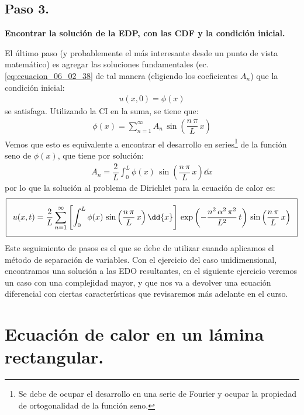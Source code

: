 \subsection{Paso 3.}

\textbf{Encontrar la solución de la EDP, con las CDF y la condición inicial.}

El último paso (y probablemente el más interesante desde un punto de vista matemático) es agregar las soluciones fundamentales (ec. \ref{eq:ecuacion_06_02_38} de tal manera (eligiendo los coeficientes $A_{n}$) que la condición inicial:
\begin{align*}
u(x, 0) = \phi (x)
\end{align*}
se satisfaga. Utilizando la CI en la suma, se tiene que:
\begin{align*}
\phi (x) = \sum_{n=1}^{\infty} A_{n} \, \sin \left( \dfrac{n \, \pi}{L} \, x \right)
\end{align*}
Vemos que esto es equivalente a encontrar el desarrollo en series\footnote{Se debe de ocupar el desarrollo en una serie de Fourier y ocupar la propiedad de ortogonalidad de la función seno.} de la función seno de $\phi (x)$, que tiene por solución:
\begin{align}
A_{n} = \dfrac{2}{L} \int_{0}^{L} \phi (x) \, \sin \left( \dfrac{n \, \pi}{L} \, x \right) \dd{x}
\label{eq:ecuacion_06_02_40}    
\end{align}
por lo que la solución al problema de Dirichlet para la ecuación de calor es:
\begin{align}
\addtolength{\fboxsep}{5pt}\boxed{
u (x, t) = \dfrac{2}{L} \sum_{n=1}^{\infty} \left[ \int_{0}^{L} \phi (x) \, \sin \left( \dfrac{n \, \pi}{L} \, x \right) \dd{x} \right] \, \exp \left( - \dfrac{n^{2} \, \alpha^{2} \, \pi^{2}}{L^{2}} \, t \right) \, \sin \left( \dfrac{n \, \pi}{L} \, x \right)}
\label{eq:ecuacion_06_02_41}    
\end{align}
Este seguimiento de pasos es el que se debe de utilizar cuando aplicamos el método de separación de variables. Con el ejercicio del caso unidimensional, encontramos una solución a las EDO resultantes, en el siguiente ejercicio veremos un caso con una complejidad mayor, y que nos va a devolver una ecuación diferencial con ciertas características que revisaremos más adelante en el curso.

\section{Ecuación de calor en un lámina rectangular.}


